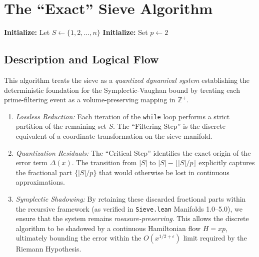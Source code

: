\documentclass[sn-mathphys-num, pdflatex, referee]{sn-jnl}
\begin{document}
\section{The ``Exact'' Sieve Algorithm}
\label{alg:exact_sieve}

\begin{algorithm}[ht]
\SetAlgoLined
\DontPrintSemicolon
{}

\textbf{Initialize:} Let $S \leftarrow \{1, 2, \dots, n\}$\;
\textbf{Initialize:} Set $p \leftarrow 2$\;

\;
\caption{The ``Exact'' Sieve as a Discrete Dynamical System. }

\end{algorithm}
\subsection*{Description and Logical Flow}
 This algorithm treats the sieve as a \textit{quantized dynamical system} establishing the deterministic foundation for the Symplectic-Vaughan bound by treating each prime-filtering event as a volume-preserving mapping in $\mathbb{Z}^+$.

\begin{enumerate}
    \item \textit{Lossless Reduction:} Each iteration of the \texttt{while} loop performs a strict partition of the remaining set $S$. The ``Filtering Step'' is the discrete equivalent of a coordinate transformation on the sieve manifold.
    \item \textit{Quantization Residuals:} The ``Critical Step'' identifies the exact origin of the error term $\Delta(x)$. The transition from $|S|$ to $|S| - \lfloor |S|/p \rfloor$ explicitly captures the fractional part $\{|S|/p\}$ that would otherwise be lost in continuous approximations.
    \item \textit{Symplectic Shadowing:} By retaining these discarded fractional parts within the recursive framework (as verified in \texttt{Sieve.lean} Manifolds 1.0--5.0), we ensure that the system remains \textit{measure-preserving}. This allows the discrete algorithm to be shadowed by a continuous Hamiltonian flow $H=xp$, ultimately bounding the error within the $O(x^{1/2+\epsilon})$ limit required by the Riemann Hypothesis.
\end{enumerate}
\end{document}
